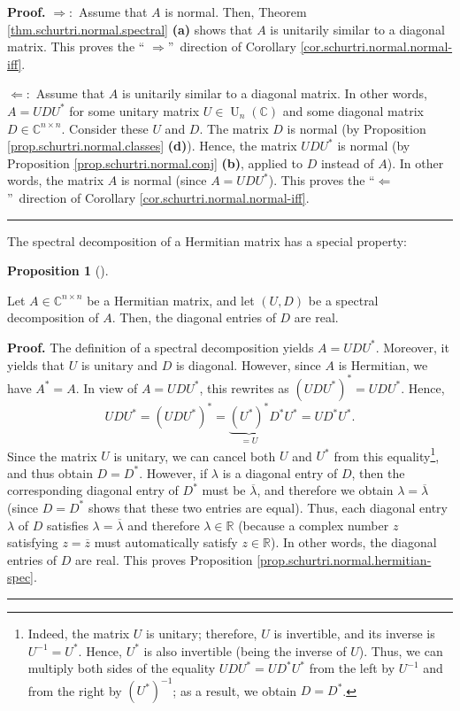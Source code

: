 \documentclass[numbers=enddot,12pt,final,onecolumn,notitlepage]{scrartcl}%
\numberwithin{exer}{subsection}
\theoremstyle{definition}
\newtheorem{prop}[theo]{Proposition}
\newenvironment{proposition}[1][]
{\begin{prop}[#1]\begin{leftbar}}
{\end{leftbar}\end{prop}}
\newenvironment{proof}[1][Proof]{\noindent\textbf{#1.} }{\ \rule{0.5em}{0.5em}}
\begin{document}
\begin{proof}
$\Longrightarrow:$ Assume that $A$ is normal. Then, Theorem
\ref{thm.schurtri.normal.spectral} \textbf{(a)} shows that $A$ is unitarily
similar to a diagonal matrix. This proves the \textquotedblleft%
$\Longrightarrow$\textquotedblright\ direction of Corollary
\ref{cor.schurtri.normal.normal-iff}. \medskip

$\Longleftarrow:$ Assume that $A$ is unitarily similar to a diagonal matrix.
In other words, $A=UDU^{\ast}$ for some unitary matrix $U\in\operatorname*{U}%
\nolimits_{n}\left(  \mathbb{C}\right)  $ and some diagonal matrix
$D\in\mathbb{C}^{n\times n}$. Consider these $U$ and $D$. The matrix $D$ is
normal (by Proposition \ref{prop.schurtri.normal.classes} \textbf{(d)}).
Hence, the matrix $UDU^{\ast}$ is normal (by Proposition
\ref{prop.schurtri.normal.conj} \textbf{(b)}, applied to $D$ instead of $A$).
In other words, the matrix $A$ is normal (since $A=UDU^{\ast}$). This proves
the \textquotedblleft$\Longleftarrow$\textquotedblright\ direction of
Corollary \ref{cor.schurtri.normal.normal-iff}.
\end{proof}

The spectral decomposition of a Hermitian matrix has a special property:

\begin{proposition}
\label{prop.schurtri.normal.hermitian-spec}Let $A\in\mathbb{C}^{n\times n}$ be
a Hermitian matrix, and let $\left(  U,D\right)  $ be a spectral decomposition
of $A$. Then, the diagonal entries of $D$ are real.
\end{proposition}

\begin{proof}
The definition of a spectral decomposition yields $A=UDU^{\ast}$. Moreover, it
yields that $U$ is unitary and $D$ is diagonal. However, since $A$ is
Hermitian, we have $A^{\ast}=A$. In view of $A=UDU^{\ast}$, this rewrites as
$\left(  UDU^{\ast}\right)  ^{\ast}=UDU^{\ast}$. Hence,
\[
UDU^{\ast}=\left(  UDU^{\ast}\right)  ^{\ast}=\underbrace{\left(  U^{\ast
}\right)  ^{\ast}}_{=U}D^{\ast}U^{\ast}=UD^{\ast}U^{\ast}.
\]
Since the matrix $U$ is unitary, we can cancel both $U$ and $U^{\ast}$ from
this equality\footnote{Indeed, the matrix $U$ is unitary; therefore, $U$ is
invertible, and its inverse is $U^{-1}=U^{\ast}$. Hence, $U^{\ast}$ is also
invertible (being the inverse of $U$). Thus, we can multiply both sides of the
equality $UDU^{\ast}=UD^{\ast}U^{\ast}$ from the left by $U^{-1}$ and from the
right by $\left(  U^{\ast}\right)  ^{-1}$; as a result, we obtain $D=D^{\ast}%
$.}, and thus obtain $D=D^{\ast}$. However, if $\lambda$ is a diagonal entry
of $D$, then the corresponding diagonal entry of $D^{\ast}$ must be
$\overline{\lambda}$, and therefore we obtain $\lambda=\overline{\lambda}$
(since $D=D^{\ast}$ shows that these two entries are equal). Thus, each
diagonal entry $\lambda$ of $D$ satisfies $\lambda=\overline{\lambda}$ and
therefore $\lambda\in\mathbb{R}$ (because a complex number $z$ satisfying
$z=\overline{z}$ must automatically satisfy $z\in\mathbb{R}$). In other words,
the diagonal entries of $D$ are real. This proves Proposition
\ref{prop.schurtri.normal.hermitian-spec}.
\end{proof}
\end{document}
